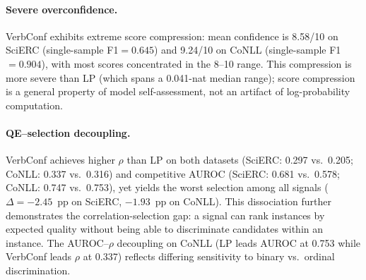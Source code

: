 \begin{table}[t]
\centering
\small
\caption{Verbalized confidence (VerbConf) vs.\ log-probability selection (Qwen3-8B, $N{=}8$, $T{=}1.0$, seed${=}42$). Parse fail: fraction of samples where the confidence score could not be extracted.}
\label{tab:verbconf}
\end{table}

\paragraph{Severe overconfidence.}
VerbConf exhibits extreme score compression: mean confidence is 8.58/10 on SciERC (single-sample F1${=}0.645$) and 9.24/10 on CoNLL (single-sample F1${=}0.904$), with most scores concentrated in the 8--10 range.
This compression is more severe than LP (which spans a 0.041-nat median range); score compression is a general property of model self-assessment, not an artifact of log-probability computation.

\paragraph{QE--selection decoupling.}
VerbConf achieves higher $\rho$ than LP on both datasets (SciERC: 0.297 vs.\ 0.205; CoNLL: 0.337 vs.\ 0.316) and competitive AUROC (SciERC: 0.681 vs.\ 0.578; CoNLL: 0.747 vs.\ 0.753), yet yields the worst selection among all signals ($\Delta{=}{-}2.45$~pp on SciERC, $-1.93$~pp on CoNLL).
This dissociation further demonstrates the correlation-selection gap: a signal can rank instances by expected quality without being able to discriminate candidates within an instance.
The AUROC--$\rho$ decoupling on CoNLL (LP leads AUROC at 0.753 while VerbConf leads $\rho$ at 0.337) reflects differing sensitivity to binary vs.\ ordinal discrimination.

